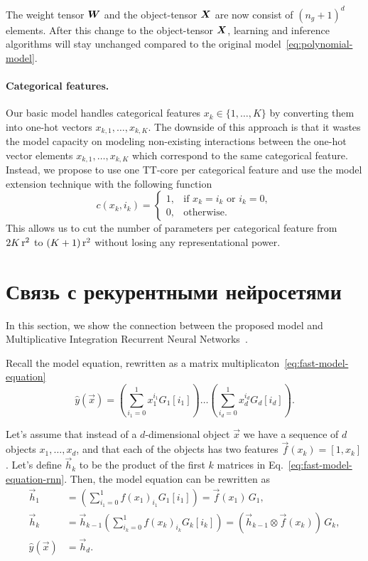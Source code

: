 The weight tensor $\boldsymbol{W}$ and the object-tensor $\boldsymbol{X}$ are now consist of $(n_g + 1)^d$ elements.
After this change to the object-tensor $\boldsymbol{X}$, learning and inference algorithms will stay unchanged compared to the original model~\eqref{eq:polynomial-model}.

\paragraph{Categorical features.} Our basic model handles categorical features $x_k \in \{1, \ldots, K\}$ by converting them into one-hot vectors $x_{k,1}, \ldots, x_{k,K}$. The downside of this approach is that it wastes the model capacity on modeling non-existing interactions between the one-hot vector elements $x_{k,1}, \ldots, x_{k,K}$ which correspond to the same categorical feature. Instead, we propose to use one TT-core per categorical feature and use the model extension technique with the following function
\begin{equation*}
c(x_k, i_k) =
\begin{cases}
1, & \text{if } x_k = i_k \text{ or } i_k = 0,\\
0, & \text{otherwise.}
\end{cases}
\end{equation*}
This allows us to cut the number of parameters per categorical feature from $2K\operatorname{r}^2$ to $(K + 1)\operatorname{r}^2$ without losing any representational power.

\section{Связь с рекурентными нейросетями}
In this section, we show the connection between the proposed model and Multiplicative Integration Recurrent Neural Networks~\cite{wu2016multiplicative}.

Recall the model equation, rewritten as a matrix multiplicaton~\eqref{eq:fast-model-equation}
\begin{equation}
\label{eq:fast-model-equation-rnn}
\widehat{y}(\vec{x}) = \left ( \sum_{i_1=0}^1 x_1^{i_1} G_1[i_1] \right ) \ldots \left ( \sum_{i_d=0}^1 x_d^{i_d} G_d[i_d] \right ).
\end{equation}

 Let's assume that instead of a $d$-dimensional object $\vec{x}$ we have a sequence of $d$ objects $x_1, \ldots, x_d$, and that each of the objects has two features $\vec{f}(x_k) = [1, x_k]$. Let's define $\vec{h}_k$ to be the product of the first $k$ matrices in Eq.~\eqref{eq:fast-model-equation-rnn}. Then, the model equation can be rewritten as
 \begin{align*}
\vec{h}_1 &=  \left ( \sum_{i_1=0}^1 f(x_1)_{i_1} G_1[i_1] \right ) = \vec{f}(x_1) \, G_1,\\
\vec{h}_k &= \vec{h}_{k-1} \left ( \sum_{i_k=0}^1 f(x_k)_{i_k} G_k[i_k] \right ) = \left (\vec{h}_{k-1} \otimes \vec{f}(x_k) \right) \, G_k,\\
\widehat{y}(\vec{x}) &= \vec{h}_d.
\end{align*}

